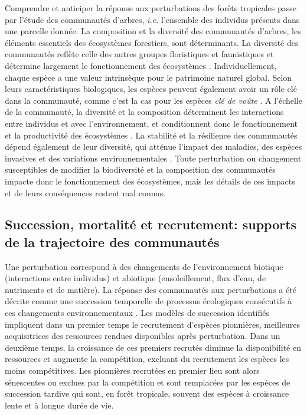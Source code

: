 \documentclass[
  11pt,
  french,
  A4paper,
  extrafontsizes,onecolumn,openright
  ]{memoir}
\begin{document}
Comprendre et anticiper la réponse aux perturbations des forêts
tropicales passe par l'étude des communautés d'arbres, \emph{i.e.}
l'ensemble des individus présents dans une parcelle donnée. La
composition et la diversité des communautés d'arbres, les éléments
essentiels des écosystèmes forestiers, sont déterminants. La diversité
des communautés reflète celle des autres groupes floristiques et
faunistiques et détermine largement le fonctionnement des écosystèmes
\autocite{Guitet2018}. Individuellement, chaque espèce a une valeur
intrinsèque pour le patrimoine naturel global. Selon leurs
caractéristiques biologiques, les espèces peuvent également avoir un
rôle clé dans la communauté, comme c'est la cas pour les espèces
\emph{clé de voûte} \autocites{Jones1994}{Power1996}{Gardner2007}. A
l'échelle de la communauté, la diversité et la composition déterminent
les interactions entre individus et avec l'environnement, et
conditionnent donc le fonctionnement et la productivité des écosystèmes
\autocite{Begon2006}. La stabilité et la résilience des communautés
dépend également de leur diversité, qui atténue l'impact des maladies,
des espèces invasives et des variations environnementales
\autocite{Elmqvist2003}. Toute perturbation ou changement susceptibles
de modifier la biodiversité et la composition des communautés impacte
donc le fonctionnement des écosystèmes, mais les détails de ces impacts
et de leurs conséquences restent mal connus.

\subsection{Succession, mortalité et recrutement: supports de la
trajectoire des
communautés}\label{succession-mortalite-et-recrutement-supports-de-la-trajectoire-des-communautes}

Une perturbation correspond à des changements de l'environnement
biotique (interactions entre individus) et abiotique (ensoleillement,
flux d'eau, de nutriments et de matière). La réponse des communautés aux
perturbations a été décrite comme une succession temporelle de processus
écologiques consécutifs à ces changements environnementaux
\autocite{Clements1916}. Les modèles de succession identifiés impliquent
dans un premier temps le recrutement d'espèces pionnières, meilleures
acquisitrices des ressources rendues disponibles après perturbation.
Dans un deuxième temps, la croissance de ces premiers recrutés diminue
la disponibilité en ressources et augmente la compétition, excluant du
recrutement les espèces les moins compétitives. Les pionnières recrutées
en premier lieu sont alors sénescentes ou exclues par la compétition et
sont remplacées par les espèces de succession tardive qui sont, en forêt
tropicale, souvent des espèces à croissance lente et à longue durée de
vie.
\end{document}
